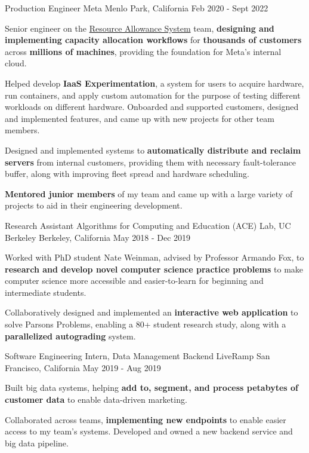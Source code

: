 \begin{cventries}
\cventry
{Production Engineer}
{\acvHeaderIconSep Meta}
{Menlo Park, California}
{Feb 2020 - Sept 2022}
{
\begin{cvitems}
\item Senior engineer on the \href{https://dl.acm.org/doi/10.1145/3477132.3483578}{Resource Allowance System} team, \textbf{designing and implementing capacity allocation workflows} for \textbf{thousands of customers} across \textbf{millions of machines}, providing the foundation for Meta's internal cloud. 
\item Helped develop \textbf{IaaS Experimentation}, a system for users to acquire hardware, run containers, and apply custom automation for the purpose of testing different workloads on different hardware. Onboarded and supported customers, designed and implemented features, and came up with new projects for other team members. 
\item Designed and implemented systems to \textbf{automatically distribute and reclaim servers} from internal customers, providing them with necessary fault-tolerance buffer, along with improving fleet spread and hardware scheduling. 
\item \textbf{Mentored junior members} of my team and came up with a large variety of projects to aid in their engineering development.
\end{cvitems}
}

\cventry
{Research Assistant}
{Algorithms for Computing and Education (ACE) Lab, UC Berkeley}
{Berkeley, California}
{May 2018 - Dec 2019}
{
	\begin{cvitems}
		\item Worked with PhD student Nate Weinman, advised by Professor Armando Fox, to \textbf{research and develop novel computer science practice problems}
		to make computer science more accessible and easier-to-learn for beginning and intermediate students.
		\item Collaboratively designed and implemented an \textbf{interactive web application} to solve Parsons Problems, enabling a 80+ student research study, along with a \textbf{parallelized autograding} system. 
	\end{cvitems}  
}


    \cventry
      {Software Engineering Intern, Data Management Backend}
      {LiveRamp}
      {San Francisco, California}
      {May 2019 - Aug 2019}
      {
        \begin{cvitems}
          \item Built big data systems, helping \textbf{add to, segment, and process petabytes of customer data} to enable data-driven marketing.
          \item Collaborated across teams, \textbf{implementing new endpoints} to enable easier access to my team's systems. Developed and owned a new backend service and big data pipeline.
        \end{cvitems}
      }



\end{cventries}
